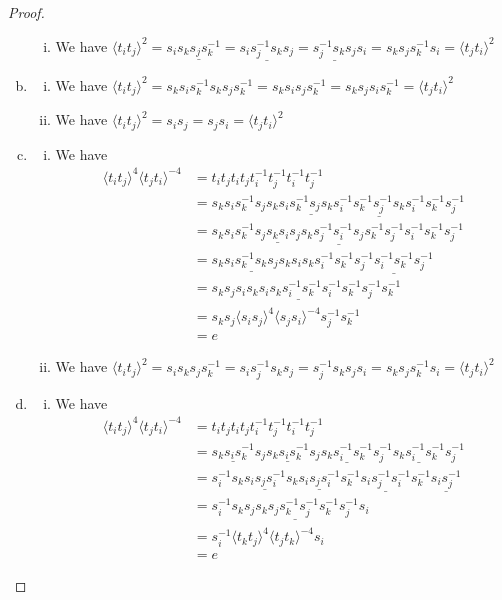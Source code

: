 \documentclass[11pt]{amsart}
\theoremstyle{definition}
\begin{document}
\begin{proof}
\begin{enumerate}[a)]
\begin{enumerate}[i)]
\item We have $\langle t_it_j \rangle^{2} = s_i\underline{s_ks_js_k^{-1}} = \underline{s_is_j^{-1}s_ks_j} = \underline{s_j^{-1}s_ks_j}s_i = s_ks_js_k^{-1}s_i = \langle t_jt_i \rangle^{2}$
\end{enumerate}
\item
\begin{enumerate}[i)]
\item We have $\langle t_it_j \rangle^{2} = s_ks_is_k^{-1}s_ks_js_k^{-1} = s_ks_is_js_k^{-1} = s_ks_js_is_k^{-1} = \langle t_jt_i \rangle^{2}$
\item We have $\langle t_it_j \rangle^{2} = s_is_j = s_js_i = \langle t_jt_i \rangle^{2}$
\end{enumerate}
\item
\begin{enumerate}[i)]
\item We have
\begin{align*}
\langle t_it_j \rangle^{4}\langle t_jt_i \rangle^{-4} &= t_it_jt_it_jt_i^{-1}t_j^{-1}t_i^{-1}t_j^{-1}\\
 &= s_ks_is_k^{-1}s_js_ks_i\underline{s_k^{-1}s_js_k}s_i^{-1}\underline{s_k^{-1}s_j^{-1}s_k}s_i^{-1}s_k^{-1}s_j^{-1}\\
&=s_ks_is_k^{-1}\underline{s_js_ks_is_j}s_k\underline{s_j^{-1}s_i^{-1}s_j}s_k^{-1}s_j^{-1}s_i^{-1}s_k^{-1}s_j^{-1}\\
&=s_k\underline{s_is_k^{-1}s_ks_j}s_ks_is_ks_i^{-1}s_k^{-1}\underline{s_j^{-1}s_i^{-1}s_k^{-1}s_j^{-1}}\\
&=s_ks_j\underline{s_is_ks_is_ks_i^{-1}s_k^{-1}s_i^{-1}s_k^{-1}}s_j^{-1}s_k^{-1}\\
&= s_ks_j\langle s_is_j \rangle^{4}\langle s_js_i \rangle^{-4}s_j^{-1}s_k^{-1} \\
&= e
\end{align*}

\item We have $\langle t_it_j \rangle^{2} = s_is_ks_js_k^{-1} = s_is_j^{-1}s_ks_j = s_j^{-1}s_ks_js_i = s_ks_js_k^{-1}s_i = \langle t_jt_i \rangle^{2}$
\end{enumerate}
\item
\begin{enumerate}[i)]
\item We have
\begin{align*}
\langle t_it_j \rangle^{4}\langle t_jt_i \rangle^{-4} &= t_it_jt_it_jt_i^{-1}t_j^{-1}t_i^{-1}t_j^{-1}\\
&= \underline{s_ks_is_k^{-1}}s_j\underline{s_ks_is_k^{-1}}s_j\underline{s_ks_i^{-1}s_k^{-1}}s_j^{-1}\underline{s_ks_i^{-1}s_k^{-1}}s_j^{-1}\\
&= s_i^{-1}s_k\underline{s_is_js_i^{-1}}s_k\underline{s_is_js_i^{-1}}s_k^{-1}\underline{s_is_j^{-1}s_i^{-1}}s_k^{-1}\underline{s_is_j^{-1}}\\
&= s_i^{-1}\underline{s_ks_js_ks_js_k^{-1}s_j^{-1}s_k^{-1}s_j^{-1}}s_i\\
&= s_i^{-1}\langle t_kt_j \rangle^{4}\langle t_jt_k \rangle^{-4}s_i\\
&= e
\end{align*}


\end{enumerate}
\end{enumerate}
\end{proof}
\end{document}

